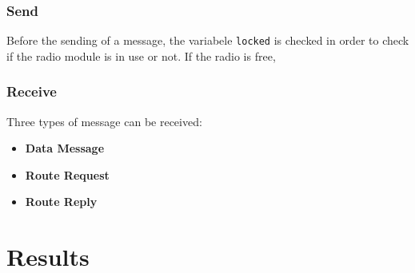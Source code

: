 \documentclass[11pt]{article}
\begin{document}
\subsubsection{Send}
Before the sending of a message, the variabele \texttt{locked} is checked in order to check if the radio module is in use or not.
If the radio is free, 
\subsubsection{Receive}
Three types of message can be received:
\begin{itemize}
	\item{\textbf{Data Message}}
	\item{\textbf{Route Request}}
	\item{\textbf{Route Reply}}
\end{itemize}
\section{Results}
\end{document}
